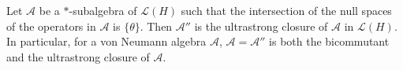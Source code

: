 \begin{theorem}
Let $\mathcal{A}$ be a $*$-subalgebra of $\mathcal{L}(H)$ such that the intersection of the null spaces of the operators in $\mathcal{A}$ is $\{\theta\}$. Then $\mathcal{A}''$ is the ultrastrong closure of $\mathcal{A}$ in $\mathcal{L}(H)$. In particular, for a von Neumann algebra $\mathcal{A}$, $\mathcal{A} = \mathcal{A}''$ is both the bicommutant and the ultrastrong closure of $\mathcal{A}$.
\end{theorem}
